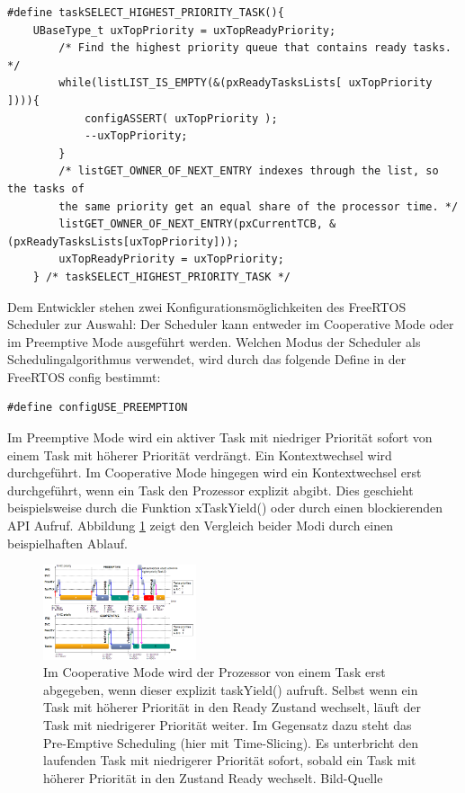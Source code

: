 \begin{lstlisting}[caption={FreeRTOS Source zur Priroty Task Selection aus Task.c. Alle lauffähigen Tasks werden in einem Array verwaltet pxReadyTaskLists. Die Listen verwalten sich durch Referenz-Pointer in den TCBs der einzelnen Tasks.}, linewidth=8cm,captionpos=b, label=lst:nextTask, float=hbt]
#define taskSELECT_HIGHEST_PRIORITY_TASK(){																									
	UBaseType_t uxTopPriority = uxTopReadyPriority;														
		/* Find the highest priority queue that contains ready tasks. */								
		while(listLIST_IS_EMPTY(&(pxReadyTasksLists[ uxTopPriority ]))){																								
			configASSERT( uxTopPriority );																
			--uxTopPriority;																			
		}																								
		/* listGET_OWNER_OF_NEXT_ENTRY indexes through the list, so the tasks of						
		the	same priority get an equal share of the processor time. */									
		listGET_OWNER_OF_NEXT_ENTRY(pxCurrentTCB, &(pxReadyTasksLists[uxTopPriority]));			
		uxTopReadyPriority = uxTopPriority;																
	} /* taskSELECT_HIGHEST_PRIORITY_TASK */
\end{lstlisting}
Dem Entwickler stehen zwei Konfigurationsmöglichkeiten des FreeRTOS Scheduler zur Auswahl: Der Scheduler kann entweder im Cooperative Mode oder im Preemptive Mode ausgeführt werden. Welchen Modus der Scheduler als Schedulingalgorithmus verwendet, wird durch das folgende Define in der FreeRTOS config bestimmt:
\begin{lstlisting}[numbers = none]
#define configUSE_PREEMPTION
\end{lstlisting}
Im Preemptive Mode wird ein aktiver Task mit niedriger Priorität sofort von einem Task mit höherer Priorität verdrängt. Ein Kontextwechsel wird durchgeführt. Im Cooperative Mode hingegen wird ein Kontextwechsel erst durchgeführt, wenn ein Task den Prozessor explizit abgibt. Dies geschieht beispielsweise durch die Funktion xTaskYield() oder durch einen blockierenden API Aufruf. Abbildung \ref{fig:PreVSCo} zeigt den Vergleich beider Modi durch einen beispielhaften Ablauf. 
\begin{figure}[htb]
	\centering
		\includegraphics[width=0.4\textwidth]{Pictures/EMCUIT/PreemptiveCooperative.png}
	\caption{Im Cooperative Mode wird der Prozessor von einem Task erst abgegeben, wenn dieser explizit taskYield() aufruft. Selbst wenn ein Task mit höherer Priorität in den Ready Zustand wechselt, läuft der Task mit niedrigerer Priorität weiter. Im Gegensatz dazu steht das Pre-Emptive Scheduling (hier mit Time-Slicing). Es unterbricht den laufenden Task mit niedrigerer Priorität sofort, sobald ein Task mit höherer Priorität in den Zustand Ready wechselt. Bild-Quelle~\protect{}}
	\label{fig:PreVSCo}
\end{figure}
